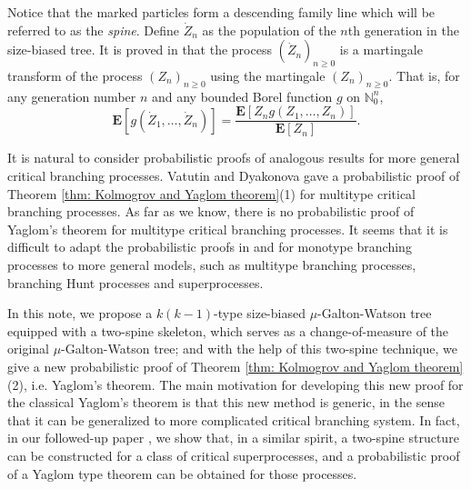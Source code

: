 \documentclass[12pt,a4paper]{amsart}
\numberwithin{equation}{section}
\begin{document}
	Notice that the marked particles form a descending family line which will be referred to as the \emph{spine}.
	Define $\dot Z_n$ as the population of the $n$th generation in the size-biased tree.
	It is proved in \cite{lyons1995conceptual} that the process $(\dot Z_n)_{n\ge 0}$ is a martingale transform of the process $(Z_n)_{n\ge 0}$ using the martingale $(Z_n)_{n\ge 0}.$
	That is, for any generation number $n$ and any bounded Borel function $g$ on $\mathbb N_0^{n}$,
\begin{equation}
\label{eq:htransformation}
	\mathbf E [ g ( \dot Z_1, \dots, \dot Z_n) ]
	= \frac { \mathbf E[ Z_n g( Z_1, \dots, Z_n)]} {\mathbf E [ Z_n]}.
\end{equation}

	It is natural to consider probabilistic proofs of analogous results for more general critical branching processes. Vatutin and  Dyakonova \cite{VD} gave a probabilistic proof of Theorem \ref{thm: Kolmogrov and Yaglom theorem}(1) for multitype critical branching processes.
	As far as we know, there is no probabilistic proof of Yaglom's theorem for multitype critical branching processes. 
	It seems that it is difficult to adapt the probabilistic proofs in \cite{geiger2000new} and \cite{lyons1995conceptual} for monotype branching processes to more general models, such as multitype branching processes, branching Hunt processes and superprocesses.

	In this note, we propose a $k(k-1)$-type size-biased $\mu$-Galton-Watson tree equipped with a two-spine skeleton, which serves as a change-of-measure of the original $\mu$-Galton-Watson tree;
	and with the help of this two-spine technique, we give a new probabilistic proof of Theorem \ref{thm: Kolmogrov and Yaglom theorem}(2), i.e. Yaglom's theorem.
	The main motivation for developing this new proof for the classical Yaglom's theorem is that this new method is generic, in the sense that it can be generalized to more complicated critical branching system. 
	In fact, in our followed-up paper \cite{RenSongSun2017Spine}, we show that, in a similar spirit, a two-spine structure can be constructed for a class of critical superprocesses, and a probabilistic proof of a Yaglom type theorem can be obtained for those processes. 
\end{document}
